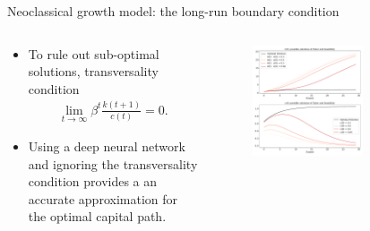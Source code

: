 \documentclass[aspectratio=169,10pt]{beamer}
\begin{document}
\begin{frame}{Neoclassical growth model: the long-run boundary condition}
	\begin{columns}
		\begin{column}{0.35\textwidth}
			\begin{itemize}
				\item To rule out sub-optimal solutions, transversality condition
				\begin{align*}
					\lim_{t\rightarrow \infty}\beta^t \frac{k(t+1)}{c(t)} = 0.
				\end{align*}
				\vspace{0.1in}
				\item  Using a deep neural network and ignoring the transversality condition provides a an accurate approximation for the optimal capital path.
			\end{itemize}
		\end{column}
		\begin{column}{0.7\textwidth}
			\vspace{-10mm}
			\begin{figure}[t!]
				\centering
				\includegraphics[width=0.65\textwidth]{figs/TVC_violation.pdf}
				\vspace{-7mm}
			\end{figure}
		\end{column}
	\end{columns}
\end{frame}
\end{document}
